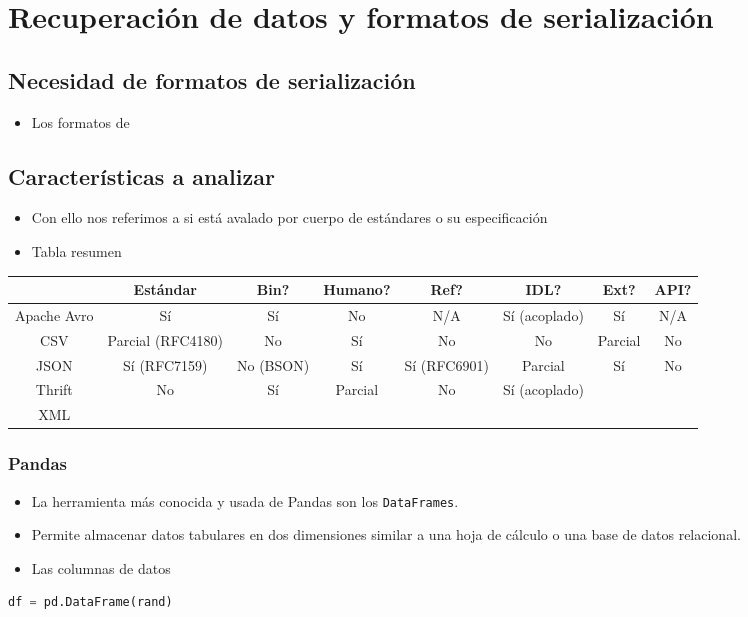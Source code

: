 \section{Recuperación de datos y formatos de serialización}
\subsection{Necesidad de formatos de serialización}
\begin{itemize}
\item Los formatos de 
\end{itemize}
\subsection{Características a analizar}
\begin{itemize}[leftmargin=*]
	\item {} Con ello nos referimos a si está avalado por  cuerpo de estándares o su especificación 
\end{itemize}
\begin{itemize}[label=\color{red}\textbullet, leftmargin=*]
	\item \color{lightblue}Tabla resumen
\end{itemize}
\begin{tabular}{cccccccc}
\hline
 & Estándar & Bin? & Humano? & Ref? & IDL? & Ext? & API? \\
\hline
Apache Avro & Sí & Sí  & No & N/A & Sí (acoplado) & Sí & N/A \\
\hline
CSV & Parcial (RFC4180) & No & Sí & No & No & Parcial  & No \\
\hline
JSON & Sí (RFC7159) & No (BSON) & Sí & Sí (RFC6901) & Parcial  & Sí & No \\
\hline
Thrift & No & Sí & Parcial  & No & Sí (acoplado) &  &  \\
\hline
XML &  &  &  &  &  &  &  \\
\hline
\end{tabular}
\subsubsection{Pandas}
\begin{itemize}
\item La herramienta más conocida y usada de Pandas son los \texttt{DataFrames}.
\item Permite almacenar datos tabulares en dos dimensiones similar a una hoja de cálculo o una base de datos relacional.
\item Las columnas de datos 
\end{itemize}
\begin{lstlisting}[language=Python]
df = pd.DataFrame(rand)
\end{lstlisting}
